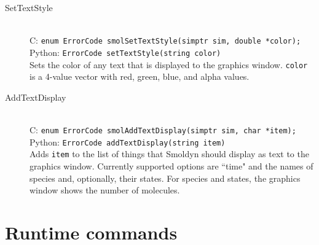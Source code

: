 \documentclass {book}
\begin{document}
\begin{description}
\item[SetTextStyle]
\hfill \\
C: \texttt{enum ErrorCode smolSetTextStyle(simptr sim, double *color);}\\
Python: \texttt{ErrorCode setTextStyle(string color)}\\
Sets the color of any text that is displayed to the graphics window. \texttt{color} is a 4-value vector with red, green, blue, and alpha values.

\item[AddTextDisplay]
\hfill \\
C: \texttt{enum ErrorCode smolAddTextDisplay(simptr sim, char *item);}\\
Python: \texttt{ErrorCode addTextDisplay(string item)}\\
Adds \texttt{item} to the list of things that Smoldyn should display as text to the graphics window. Currently supported options are ``time" and the names of species and, optionally, their states. For species and states, the graphics window shows the number of molecules.

\end{description}

\section{Runtime commands}
\end{document}
